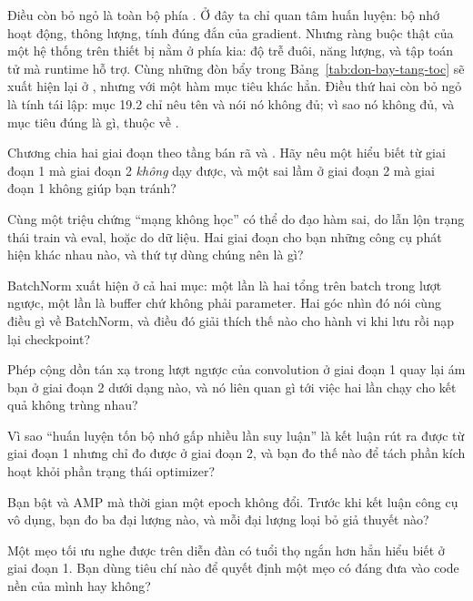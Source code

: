 \documentclass[../../deep_learning.tex]{subfiles}
\begin{document}
Điều còn bỏ ngỏ là toàn bộ phía . Ở đây ta chỉ quan tâm huấn luyện: bộ nhớ hoạt động, thông lượng, tính đúng đắn của gradient. Nhưng ràng buộc thật của một hệ thống trên thiết bị nằm ở phía kia: độ trễ đuôi, năng lượng, và tập toán tử mà runtime hỗ trợ. Cùng những đòn bẩy trong Bảng~\ref{tab:don-bay-tang-toc} sẽ xuất hiện lại ở , nhưng với một hàm mục tiêu khác hẳn. Điều thứ hai còn bỏ ngỏ là tính tái lập: mục 19.2 chỉ nêu tên  và nói nó không đủ; vì sao nó không đủ, và mục tiêu đúng là gì, thuộc về .
\begin{tukiem}
\item Chương chia hai giai đoạn theo tầng bán rã  và . Hãy nêu một hiểu biết từ giai đoạn 1 mà giai đoạn 2 \emph{không} dạy được, và một sai lầm ở giai đoạn 2 mà giai đoạn 1 không giúp bạn tránh?
\item Cùng một triệu chứng ``mạng không học'' có thể do đạo hàm sai, do lẫn lộn trạng thái train và eval, hoặc do dữ liệu. Hai giai đoạn cho bạn những công cụ phát hiện khác nhau nào, và thứ tự dùng chúng nên là gì?
\item BatchNorm xuất hiện ở cả hai mục: một lần là hai tổng trên batch trong lượt ngược, một lần là buffer chứ không phải parameter. Hai góc nhìn đó nói cùng điều gì về BatchNorm, và điều đó giải thích thế nào cho hành vi khi lưu rồi nạp lại checkpoint?
\item Phép cộng dồn tán xạ trong lượt ngược của convolution ở giai đoạn 1 quay lại ám bạn ở giai đoạn 2 dưới dạng nào, và nó liên quan gì tới việc hai lần chạy cho kết quả không trùng nhau?
\item Vì sao ``huấn luyện tốn bộ nhớ gấp nhiều lần suy luận'' là kết luận rút ra được từ giai đoạn 1 nhưng chỉ đo được ở giai đoạn 2, và bạn đo thế nào để tách phần kích hoạt khỏi phần trạng thái optimizer?
\item Bạn bật  và AMP mà thời gian một epoch không đổi. Trước khi kết luận công cụ vô dụng, bạn đo ba đại lượng nào, và mỗi đại lượng loại bỏ giả thuyết nào?
\item Một mẹo tối ưu nghe được trên diễn đàn có tuổi thọ ngắn hơn hẳn hiểu biết ở giai đoạn 1. Bạn dùng tiêu chí nào để quyết định một mẹo có đáng đưa vào code nền của mình hay không?
\end{tukiem}
\ifSubfilesClassLoaded{\printbibliography[title={Nguồn}]}{}
\end{document}
